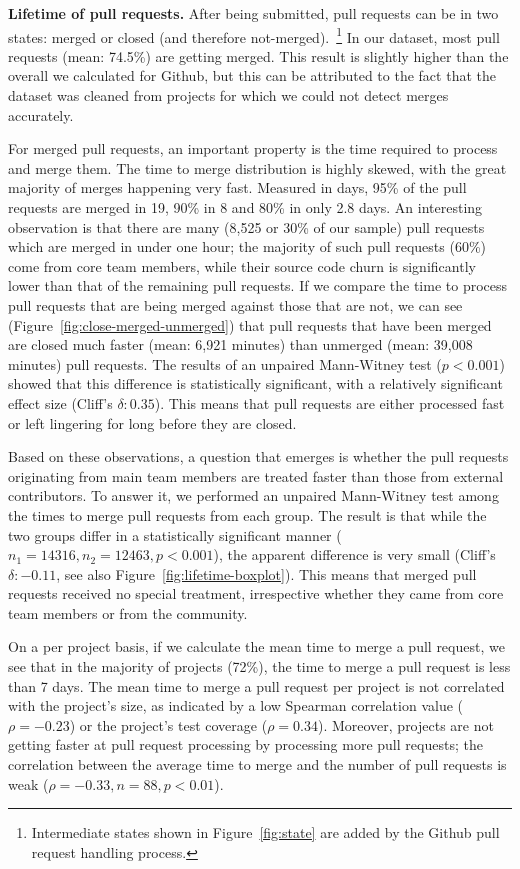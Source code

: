 \documentclass{sig-alternate}
\begin{document}
\textbf{Lifetime of pull requests.}
After being submitted, pull requests can be in two states: merged or closed
(and therefore not-merged).~\footnote{Intermediate states shown in
Figure~\ref{fig:state} are added by the Github pull request handling process.} 
In our dataset, most pull requests (mean: 74.5\%) are getting
merged. This result is slightly higher than the overall we calculated for
Github, but this can be attributed to the fact that the dataset was cleaned
from projects for which we could not detect merges accurately. 

For merged pull requests, an important property is the time required to process
and merge them. The time to merge distribution is highly skewed, with the great
majority of merges happening very fast. Measured in days, 95\% of the pull
requests are merged in 19, 90\% in 8 and 80\% in only 2.8 days. An interesting
observation is that there are many (8,525 or 30\% of our sample) pull requests
which are merged in under one hour; the majority of such pull requests (60\%)
come from core team members, while their source code churn is significantly
lower than that of the remaining pull requests. If we compare the time to
process pull requests that are being merged against those that are not, we can
see (Figure~\ref{fig:close-merged-unmerged}) that pull requests that have been
merged are closed much faster (mean: 6,921 minutes) than unmerged (mean: 39,008
minutes) pull requests.
The results of an unpaired Mann-Witney test ($p < 0.001$) showed that this difference is statistically significant, with a relatively
significant effect size (Cliff's $\delta: 0.35$). This means that pull requests
are either processed fast or left lingering for long before they are closed.

Based on these observations, a question that emerges is
whether the pull requests originating from main team members are treated faster
than those from external contributors. To answer it, we performed an unpaired
Mann-Witney test among the times to merge pull requests from each group. The
result is that while the two groups differ in a statistically significant manner
($n_1 = 14316, n_2 = 12463, p < 0.001$), the apparent difference is very small
(Cliff's $\delta: -0.11$, see also Figure~\ref{fig:lifetime-boxplot}). This
means that merged pull requests received no special treatment, irrespective
whether they came from core team members or from the community.

On a per project basis, if we calculate the mean time to merge a pull request,
we see that in the majority of projects (72\%), the time to merge a pull request
is less than 7 days. The mean time to merge a pull request per project is not
correlated with the project's size, as indicated by a low Spearman
correlation value ($\rho = -0.23$) or the project's test coverage ($\rho =
0.34$). 
Moreover, projects are not getting faster at pull request processing by
processing more pull requests; the correlation between the average time to merge
and the number of pull requests is weak ($\rho = -0.33, n = 88, p < 0.01$).
\end{document}
